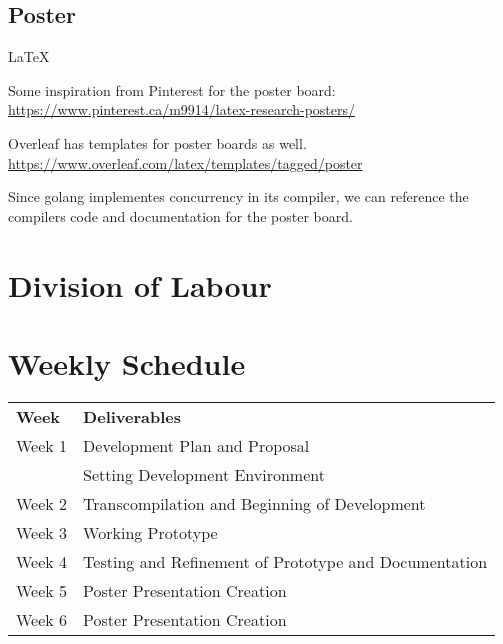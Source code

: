 \documentclass{article}
\begin{document}
\subsection{Poster} %

\LaTeX~

Some inspiration from Pinterest for the poster board:
\url{https://www.pinterest.ca/m9914/latex-research-posters/}

Overleaf has templates for poster boards as well.
\url{https://www.overleaf.com/latex/templates/tagged/poster}

Since golang implementes concurrency in its compiler, we can reference the
compilers code and documentation for the poster board.

\section{Division of Labour} %

\section{Weekly Schedule} %

\begin{center}
\begin{tabular}{ l | l }
  \textbf{Week} & \textbf{Deliverables} \\
  \hhline{=|=}
  Week 1 & Development Plan and Proposal\\
         & Setting Development Environment\\ 
  Week 2 & Transcompilation and Beginning of Development\\
  Week 3 & Working Prototype\\
  Week 4 & Testing and Refinement of Prototype and Documentation\\
  Week 5 & Poster Presentation Creation\\
  Week 6 & Poster Presentation Creation\\
\end{tabular}
\end{center}

\end{document}
